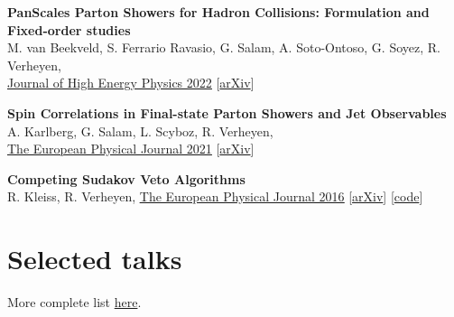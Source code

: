 \documentclass[a4paper,12pt]{article}
\begin{document}
\textbf{PanScales Parton Showers for Hadron Collisions: Formulation and Fixed-order studies} \\
M. van Beekveld, S. Ferrario Ravasio, G. Salam, A. Soto-Ontoso, G. Soyez, R. Verheyen, \\
\href{https://link.springer.com/article/10.1007/JHEP11(2022)019https://arxiv.org/abs/2205.02237}{\underline{Journal of High Energy Physics 2022}} [\href{https://arxiv.org/abs/2205.02237}{arXiv}]

\textbf{Spin Correlations in Final-state Parton Showers and Jet Observables} \\
A. Karlberg, G. Salam, L. Scyboz, R. Verheyen, \\
\href{https://link.springer.com/article/10.1140/epjc/s10052-021-09378-0}{\underline{The European Physical Journal 2021}} [\href{https://arxiv.org/pdf/2103.16526.pdf}{arXiv}]

\textbf{Competing Sudakov Veto Algorithms} \\
R. Kleiss, R. Verheyen,
\href{https://link.springer.com/article/10.1140/epjc/s10052-016-4231-5}{\underline{The European Physical Journal 2016}} [\href{https://arxiv.org/pdf/1605.09246.pdf}{arXiv}] [\href{https://github.com/rbvh/Veto-Algorithm-Toy-Shower}{code}]



\section{Selected talks}
More complete list \href{https://rbvh.github.io/}{here}.
\end{document}
